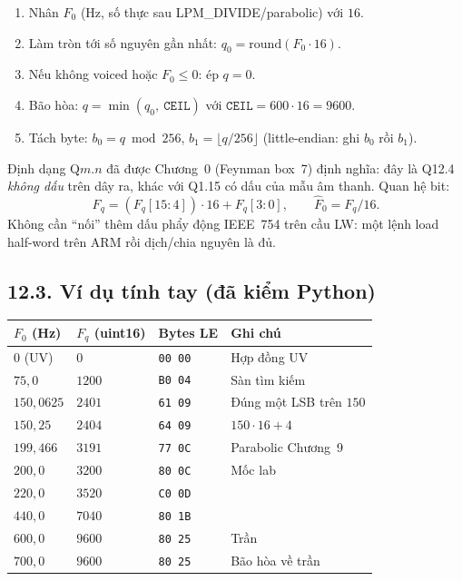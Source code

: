 \begin{enumerate}[leftmargin=1.4em]
    \item Nhân $F_0$ (Hz, số thực sau LPM\_DIVIDE/parabolic) với $16$.
    \item Làm tròn tới số nguyên gần nhất: $q_0=\mathrm{round}(F_0\cdot 16)$.
    \item Nếu không voiced hoặc $F_0\le 0$: ép $q=0$.
    \item Bão hòa: $q=\min(q_0,\ \texttt{CEIL})$ với $\texttt{CEIL}=600\cdot 16=9600$.
    \item Tách byte: $b_0=q\bmod 256$, $b_1=\lfloor q/256\rfloor$ (little-endian: ghi $b_0$ rồi $b_1$).
\end{enumerate}

Định dạng Q$m.n$ đã được Chương~0 (Feynman box~7) định nghĩa: đây là Q12.4 \emph{không dấu} trên dây ra, khác với Q1.15 có dấu của mẫu âm thanh. Quan hệ bit:
\begin{equation}
F_q = (F_q[15:4])\cdot 16 + F_q[3:0],\qquad
\hat F_0 = F_q/16.
\end{equation}
Không cần ``nối'' thêm dấu phẩy động IEEE~754 trên cầu LW: một lệnh load half-word trên ARM rồi dịch/chia nguyên là đủ.

\subsection*{12.3. Ví dụ tính tay (đã kiểm Python)}

\begin{center}\small
\begin{tabular}{@{}llll@{}}\toprule
$F_0$ (Hz) & $F_q$ (uint16) & Bytes LE & Ghi chú \\
\midrule
$0$ (UV) & $0$ & \texttt{00 00} & Hợp đồng UV \\
$75{,}0$ & $1200$ & \texttt{B0 04} & Sàn tìm kiếm \\
$150{,}0625$ & $2401$ & \texttt{61 09} & Đúng một LSB trên $150$ \\
$150{,}25$ & $2404$ & \texttt{64 09} & $150\cdot 16+4$ \\
$199{,}466$ & $3191$ & \texttt{77 0C} & Parabolic Chương~9 \\
$200{,}0$ & $3200$ & \texttt{80 0C} & Mốc lab \\
$220{,}0$ & $3520$ & \texttt{C0 0D} & \\
$440{,}0$ & $7040$ & \texttt{80 1B} & \\
$600{,}0$ & $9600$ & \texttt{80 25} & Trần \\
$700{,}0$ & $9600$ & \texttt{80 25} & Bão hòa về trần \\
\bottomrule
\end{tabular}
\end{center}

